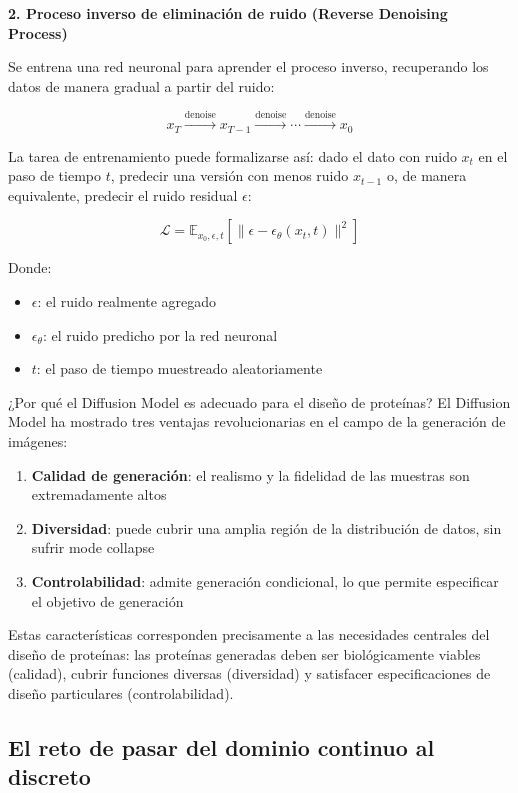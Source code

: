 \documentclass[a4paper]{article}
\begin{document}
\textbf{2. Proceso inverso de eliminación de ruido (Reverse Denoising Process)}

Se entrena una red neuronal para aprender el proceso inverso, recuperando los datos de manera gradual a partir del ruido:

$$x_T \xrightarrow{\text{denoise}} x_{T-1} \xrightarrow{\text{denoise}} \cdots \xrightarrow{\text{denoise}} x_0$$

La tarea de entrenamiento puede formalizarse así: dado el dato con ruido $x_t$ en el paso de tiempo $t$, predecir una versión con menos ruido $x_{t-1}$ o, de manera equivalente, predecir el ruido residual $\epsilon$:

$$\mathcal{L} = \mathbb{E}_{x_0, \epsilon, t} \left[ \| \epsilon - \epsilon_\theta(x_t, t) \|^2 \right]$$

Donde:
\begin{itemize}
    \item $\epsilon$: el ruido realmente agregado
    \item $\epsilon_\theta$: el ruido predicho por la red neuronal
    \item $t$: el paso de tiempo muestreado aleatoriamente
\end{itemize}

\begin{importantbox}{¿Por qué el Diffusion Model es adecuado para el diseño de proteínas?}
El Diffusion Model ha mostrado tres ventajas revolucionarias en el campo de la generación de imágenes:
\begin{enumerate}
    \item \textbf{Calidad de generación}: el realismo y la fidelidad de las muestras son extremadamente altos
    \item \textbf{Diversidad}: puede cubrir una amplia región de la distribución de datos, sin sufrir mode collapse
    \item \textbf{Controlabilidad}: admite generación condicional, lo que permite especificar el objetivo de generación
\end{enumerate}
Estas características corresponden precisamente a las necesidades centrales del diseño de proteínas: las proteínas generadas deben ser biológicamente viables (calidad), cubrir funciones diversas (diversidad) y satisfacer especificaciones de diseño particulares (controlabilidad).
\end{importantbox}

\subsection{El reto de pasar del dominio continuo al discreto}
\end{document}
